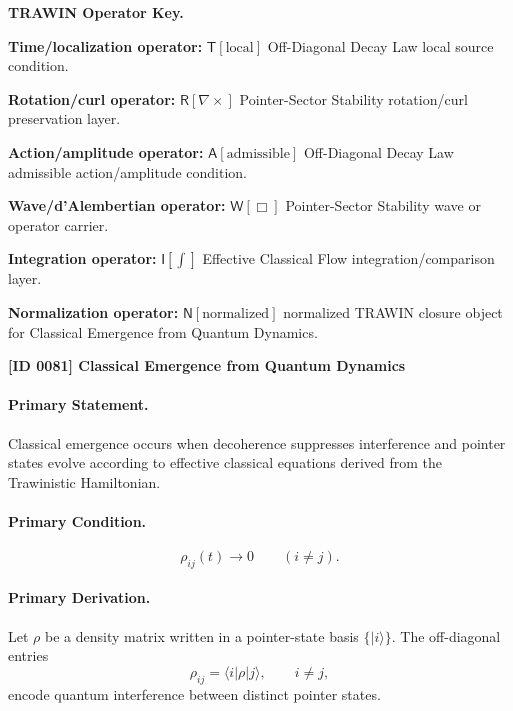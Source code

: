 \par\vspace{0.45\baselineskip}
\noindent\begin{minipage}[t]{\linewidth}
\begingroup
\small
\raggedright
\textbf{TRAWIN Operator Key.}\par
\noindent\textbf{Time/localization operator:} $\mathsf{T}\!\left[\mathrm{local}\right]$ Off-Diagonal Decay Law local source condition.\par
\noindent\textbf{Rotation/curl operator:} $\mathsf{R}\!\left[\nabla\times\right]$ Pointer-Sector Stability rotation/curl preservation layer.\par
\noindent\textbf{Action/amplitude operator:} $\mathsf{A}\!\left[\mathrm{admissible}\right]$ Off-Diagonal Decay Law admissible action/amplitude condition.\par
\noindent\textbf{Wave/d'Alembertian operator:} $\mathsf{W}\!\left[\Box\right]$ Pointer-Sector Stability wave or operator carrier.\par
\noindent\textbf{Integration operator:} $\mathsf{I}\!\left[\int\right]$ Effective Classical Flow integration/comparison layer.\par
\noindent\textbf{Normalization operator:} $\mathsf{N}\!\left[\mathrm{normalized}\right]$ normalized TRAWIN closure object for Classical Emergence from Quantum Dynamics.\par
\endgroup
\end{minipage}

\clearpage
\noindent\textbf{[ID 0081] Classical Emergence from Quantum Dynamics}\par
\vspace{0.35em}
\paragraph{Primary Statement.}
Classical emergence occurs when decoherence suppresses interference and pointer states evolve according to effective classical equations derived from the Trawinistic Hamiltonian.

\paragraph{Primary Condition.}
\begin{equation}
\rho_{ij}(t)\rightarrow 0
\qquad
(i\neq j).
\end{equation}

\paragraph{Primary Derivation.}
Let $\rho$ be a density matrix written in a pointer-state basis $\{|i\rangle\}$.  
The off-diagonal entries
\begin{equation}
\rho_{ij}
=
\langle i|\rho|j\rangle,
\qquad i\neq j,
\end{equation}
encode quantum interference between distinct pointer states.

